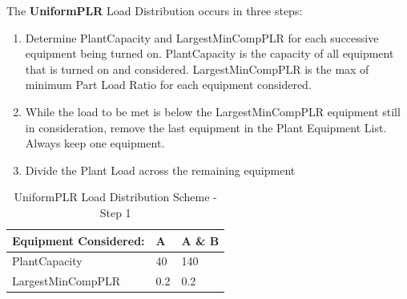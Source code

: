 The \textbf{UniformPLR} Load Distribution occurs in three steps:

\begin{enumerate}
    \def\labelenumi{Step \arabic{enumi}:}
\item
    Determine PlantCapacity and LargestMinCompPLR for each successive equipment being turned on.
    PlantCapacity is the capacity of all equipment that is turned on and considered.
    LargestMinCompPLR is the max of minimum Part Load Ratio for each equipment considered.
\item
    While the load to be met is below the LargestMinCompPLR equipment still in consideration, remove the last equipment in the Plant Equipment List. Always keep one equipment.
\item
    Divide the Plant Load across the remaining equipment
\end{enumerate}


\begin{table}[htbp]
    \centering
    \caption{UniformPLR Load Distribution Scheme - Step 1}
    \label{tab:uniformplr-load-overview}
\begin{tabular}{|l|l|l|}
\hline
Equipment Considered: & A & A \& B \\ \hline
PlantCapacity & 40 & 140 \\ \hline
LargestMinCompPLR & 0.2 & 0.2 \\ \hline
\end{tabular}
\end{table}


